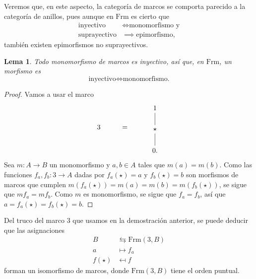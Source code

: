\documentclass[12pt,letterpaper,titlepage]{article}
\newtheorem{lemma}{Lema}
\theoremstyle{definition}
\newcommand\<{\langle}
\renewcommand\>{\rangle}
\newcommand{\Frm}{\mathrm{Frm}}
\begin{document}
Veremos que, en este aspecto, la categoría de marcos se comporta
parecido a la categoría de anillos, pues aunque en $\Frm$ es cierto que
\begin{align*}
    \text{inyectivo} &\iff \text{monomorfismo y} \\
    \text{suprayectivo} &\implies \text{epimorfismo},
\end{align*}
también existen epimorfismos no suprayectivos.

\begin{lemma}
    Todo monomorfismo de marcos es inyectivo,
    así que, en $\Frm$, un morfismo es
    \[
        \text{inyectivo} \iff \text{monomorfismo.}
    \]
\end{lemma}
\begin{proof}
    Vamos a usar el marco
    \[
        3 \hspace{10mm} = \hspace{10mm}
        \begin{tikzcd}
            1 \\ \star \ar[u,no head] \\ 0. \ar[u,no head]
        \end{tikzcd}
    \]
    Sea $m:A\to B$ un monomorfismo y $a,b\in A$ tales que $m(a)=m(b)$.
    Como las funciones $f_a,f_b:3\to A$ dadas por
    $f_a(\star)=a$ y $f_b(\star)=b$ son morfismos de marcos que cumplen
    $m(f_a(\star))=m(a)=m(b)=m(f_b(\star))$, se sigue que $mf_a=mf_b$.
    Como $m$ es monomorfismo, se sigue que $f_a=f_b$, así que
    $a=f_a(\star)=f_b(\star)=b$.
\end{proof}

Del truco del marco $3$ que usamos en la demostración anterior,
se puede deducir que las asignaciones
\begin{align*}
    B &\leftrightarrows \Frm(3,B) \\
    a &\mapsto f_a \\
    f(\star) &\mapsfrom f
\end{align*}
forman un isomorfismo de marcos,
donde $\Frm(3,B)$ tiene el orden puntual.
\end{document}

